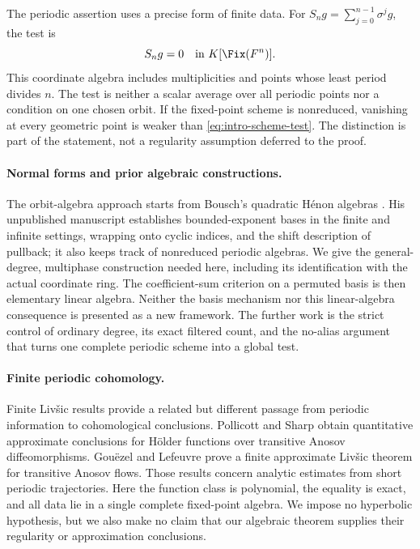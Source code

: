 The periodic assertion uses a precise form of finite data. For
$S_ng=\sum_{j=0}^{n-1}\sigma^jg$, the test is
\begin{equation}
  S_ng=0\quad\hbox{in }K[\Fix(F^n)].
  \label{eq:intro-scheme-test}
\end{equation}
This coordinate algebra includes multiplicities and points whose least
period divides $n$. The test is neither a scalar average over all periodic
points nor a condition on one chosen orbit. If the fixed-point scheme is
nonreduced, vanishing at every geometric point is weaker than
\eqref{eq:intro-scheme-test}. The distinction is part of the statement,
not a regularity assumption deferred to the proof.

\paragraph{Normal forms and prior algebraic constructions.}
The orbit-algebra approach starts from Bousch's quadratic H\'enon algebras
\citep{Bousch1992HenonAlgebras}. His unpublished manuscript establishes
bounded-exponent bases in the finite and infinite settings, wrapping onto
cyclic indices, and the shift description of pullback; it also keeps track
of nonreduced periodic algebras. We give the general-degree, multiphase
construction needed here, including its identification with the actual
coordinate ring. The coefficient-sum criterion on a permuted basis is
then elementary linear algebra. Neither the basis mechanism nor this
linear-algebra consequence is presented as a new framework. The further
work is the strict control of ordinary degree, its exact filtered count,
and the no-alias argument that turns one complete periodic scheme into
a global test.

\paragraph{Finite periodic cohomology.}
Finite Liv\v{s}ic results provide a related but different passage from
periodic information to cohomological conclusions. Pollicott and Sharp
\citep{PollicottSharp2004FiniteLivsic} obtain quantitative approximate
conclusions for H\"older functions over transitive Anosov
diffeomorphisms. Gou\"ezel and Lefeuvre
\citep{GouezelLefeuvre2021FiniteLivsic} prove a finite approximate
Liv\v{s}ic theorem for transitive Anosov flows. Those results concern
analytic estimates from short periodic trajectories. Here the function
class is polynomial, the equality is exact, and all data lie in a single
complete fixed-point algebra. We impose no hyperbolic hypothesis, but
we also make no claim that our algebraic theorem supplies their
regularity or approximation conclusions.

